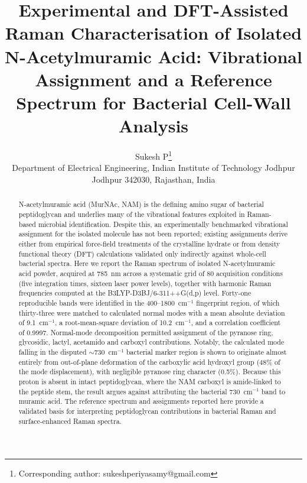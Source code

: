 \documentclass[11pt,a4paper]{article}
\newcommand{\wn}{\ensuremath{\mathrm{cm}^{-1}}}
\begin{document}
\title{Experimental and DFT-Assisted Raman Characterisation of Isolated
N-Acetylmuramic Acid: Vibrational Assignment and a Reference Spectrum for
Bacterial Cell-Wall Analysis}

\author{Sukesh P\thanks{Corresponding author: sukeshperiyasamy@gmail.com}\\[2pt]
\small Department of Electrical Engineering, Indian Institute of Technology Jodhpur\\
\small Jodhpur 342030, Rajasthan, India}
\date{}
\maketitle







\begin{abstract}
N-acetylmuramic acid (MurNAc, NAM) is the defining amino sugar of bacterial
peptidoglycan and underlies many of the vibrational features exploited in
Raman-based microbial identification. Despite this, an experimentally
benchmarked vibrational assignment for the isolated molecule has not been
reported; existing assignments derive either from empirical force-field
treatments of the crystalline hydrate or from density functional theory (DFT)
calculations validated only indirectly against whole-cell bacterial spectra.
Here we report the Raman spectrum of isolated N-acetylmuramic acid
powder, acquired at 785~nm across a systematic grid of 80 acquisition
conditions (five integration times, sixteen laser power levels), together with
harmonic Raman frequencies computed at the B3LYP-D3BJ/6-311++G(d,p) level. Forty-one
reproducible bands were identified in the 400--1800~\wn{} fingerprint region,
of which thirty-three were matched to calculated normal modes with a mean
absolute deviation of 9.1~\wn{}, a root-mean-square deviation of 10.2~\wn{},
and a correlation coefficient of 0.9997. Normal-mode decomposition permitted
assignment of the pyranose ring, glycosidic, lactyl, acetamido and carboxyl
contributions. Notably, the calculated mode falling in the disputed
$\sim$730~\wn{} bacterial marker region is shown to originate almost entirely
from out-of-plane deformation of the carboxylic acid hydroxyl group
(48\% of the mode displacement), with negligible pyranose ring character
(0.5\%). Because this proton is absent in intact peptidoglycan, where the
NAM carboxyl is amide-linked to the peptide stem, the result argues against
attributing the bacterial 730~\wn{} band to muramic acid. The reference
spectrum and assignments reported here provide a validated basis for
interpreting peptidoglycan contributions in bacterial Raman and
surface-enhanced Raman spectra.
\end{abstract}
\end{document}
